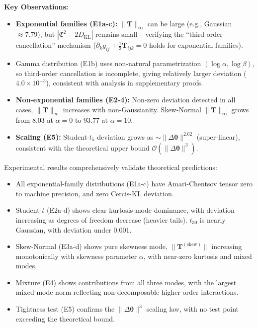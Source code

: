 \documentclass[12pt,a4paper]{article}
\theoremstyle{plain}
\theoremstyle{definition}
\theoremstyle{remark}
\newcommand{\Cercis}{\textsf{Cercis}}
\newcommand{\DKL}{D_{\mathrm{KL}}}
\newcommand{\CercisScore}{\mathfrak{C}}
\newcommand{\ACT}{\mathbf{T}}    %
\begin{document}
\begin{table}[h]
\vspace{0.5em}
\noindent
\textbf{Key Observations:}
\begin{itemize}
    \item \textbf{Exponential families (E1a-c):} $\|\ACT\|_{\infty}$ can be large (e.g., Gaussian $\approx 7.79$), but $|\CercisScore^2 - 2\DKL|$ remains small -- verifying the ``third-order cancellation'' mechanism ($\partial_k g_{ij} + \frac{1}{3}\ACT_{ijk} = 0$ holds for exponential families).
    \item Gamma distribution (E1b) uses non-natural parametrization $(\log\alpha, \log\beta)$, so third-order cancellation is incomplete, giving relatively larger deviation ($4.0\times 10^{-3}$), consistent with analysis in supplementary proofs.
    \item \textbf{Non-exponential families (E2-4):} Non-zero deviation detected in all cases, $\|\ACT\|_{\infty}$ increases with non-Gaussianity. Skew-Normal $\|\ACT\|_{\infty}$ grows from $8.03$ at $\alpha=0$ to $93.77$ at $\alpha=10$.
    \item \textbf{Scaling (E5):} Student-$t_5$ deviation grows as $\sim \|\Delta\bm{\theta}\|^{2.02}$ (super-linear), consistent with the theoretical upper bound $\mathcal{O}(\|\Delta\bm{\theta}\|^3)$.
\end{itemize}
\end{table}

Experimental results comprehensively validate theoretical predictions:
\begin{itemize}
    \item All exponential-family distributions (E1a-c) have Amari-Chentsov tensor zero to machine precision, and zero \Cercis-KL deviation.
    \item Student-$t$ (E2a-d) shows clear kurtosis-mode dominance, with deviation increasing as degrees of freedom decrease (heavier tails). $t_{30}$ is nearly Gaussian, with deviation under 0.001.
    \item Skew-Normal (E3a-d) shows pure skewness mode, $\|\ACT^{(\mathrm{skew})}\|$ increasing monotonically with skewness parameter $\alpha$, with near-zero kurtosis and mixed modes.
    \item Mixture (E4) shows contributions from all three modes, with the largest mixed-mode norm reflecting non-decomposable higher-order interactions.
    \item Tightness test (E5) confirms the $\|\Delta\bm{\theta}\|^3$ scaling law, with no test point exceeding the theoretical bound.
\end{itemize}
\end{document}
